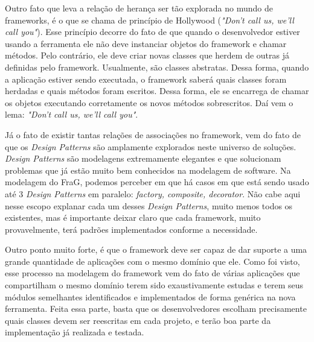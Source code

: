 \documentclass[
    12pt,       %
    openright,      %
    twoside,      %
    a4paper,      %
    english,      %
    french,       %
    spanish,      %
    brazil,       %
    ]{abntex2}
\begin{document}
          Outro fato que leva a relação de herança ser tão explorada no mundo de frameworks,
          é o que se chama de princípio de Hollywood (\textit{"Don't call us, we'll call you"}).
          Esse princípio decorre do fato de que quando o desenvolvedor estiver usando a
          ferramenta ele não deve instanciar objetos do framework e chamar métodos. Pelo
          contrário, ele deve criar novas classes que herdem de outras já definidas pelo
          framework. Usualmente, são classes abstratas. Dessa forma, quando a aplicação
          estiver sendo executada, o framework saberá quais classes foram herdadas e
          quais métodos foram escritos. Dessa forma, ele se encarrega de chamar
          os objetos executando corretamente os novos métodos sobrescritos. Daí
          vem o lema: \textit{"Don't call us, we'll call you"}.

          Já o fato de existir tantas relações de associações no framework, vem
          do fato de que os \textit{Design Patterns} são amplamente explorados neste universo de
          soluções. \textit{Design Patterns} são modelagens extremamente
          elegantes e que solucionam problemas que já estão muito bem conhecidos na
          modelagem de software. Na modelagem do FraG, podemos perceber em que há
          casos em que está sendo usado até 3 \textit{Design Patterns} em paralelo:
          \textit{factory, composite, decorator}. Não cabe aqui nesse escopo explanar
          cada um desses \textit{Design Patterns}, muito menos todos os existentes,
          mas é importante deixar claro que cada framework, muito provavelmente, terá
          padrões implementados conforme a necessidade.

          Outro ponto muito forte, é que o framework deve ser capaz de dar suporte a
          uma grande quantidade de aplicações com o mesmo domínio que ele. Como foi
          visto, esse processo na modelagem do framework vem do fato de várias
          aplicações que compartilham o mesmo domínio terem sido exaustivamente
          estudas e terem seus módulos semelhantes identificados e implementados
          de forma genérica na nova ferramenta. Feita essa parte, basta que
          os desenvolvedores escolham precisamente quais classes devem ser reescritas
          em cada projeto, e terão boa parte da implementação já realizada e testada.

\end{document}

